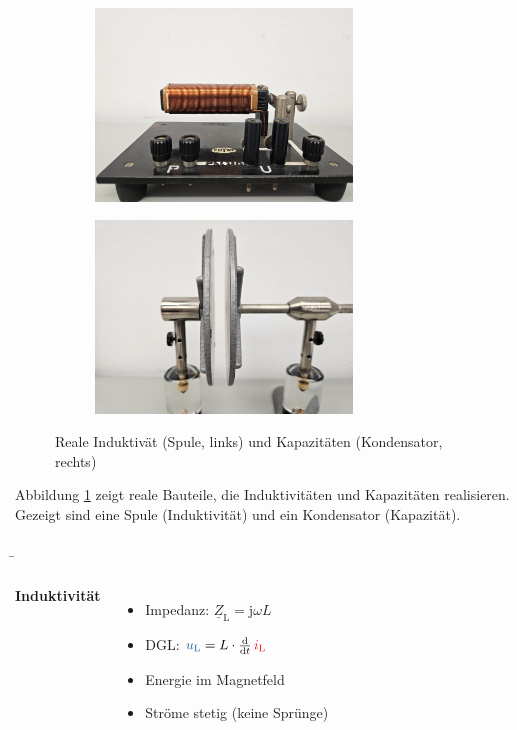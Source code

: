 \begin{frame}
{    \begin{figure}[H]\centering
        \begin{subfigure}{0.45\textwidth}\centering
            \includegraphics[width=0.75\textwidth]{./Bilder/Spule.png}
        \end{subfigure}%
        \begin{subfigure}{0.45\textwidth}\centering
            \includegraphics[width=0.75\textwidth]{./Bilder/Kondensator.png}
        \end{subfigure}
        \caption{Reale Induktivät (Spule, links) und Kapazitäten (Kondensator, rechts)}\label{fig:bauteile:realebauteile}
    \end{figure}
    Abbildung \ref{fig:bauteile:realebauteile} zeigt reale Bauteile, die Induktivitäten und Kapazitäten realisieren. 
    Gezeigt sind eine Spule (Induktivität) und ein Kondensator (Kapazität).
}
\b{%
\begin{columns}
    \textbf{Induktivität}%
    \begin{itemize}
        \item Impedanz: $\underline{Z}_{\mathrm L} = \mathrm{j}\omega L$
        \item DGL: $\ecv{u_{\mathrm L}} = L \cdot \frac{\d}{\d t}\, \eci{i_{\mathrm L}}$
        \item Energie im Magnetfeld
        \item Ströme stetig (keine Sprünge)
    \end{itemize}


\end{columns}}
\end{frame}
